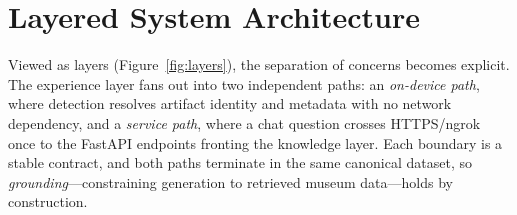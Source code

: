 \FloatBarrier

\section{Layered System Architecture}

Viewed as layers (Figure~\ref{fig:layers}), the separation of concerns becomes
explicit. The experience layer fans out into two independent paths: an
\emph{on-device path}, where detection resolves artifact identity and metadata
with no network dependency, and a \emph{service path}, where a chat question
crosses HTTPS/ngrok once to the FastAPI endpoints fronting the knowledge layer.
Each boundary is a stable contract, and both paths terminate in the same
canonical dataset, so \emph{grounding}---constraining generation to retrieved
museum data---holds by construction.


